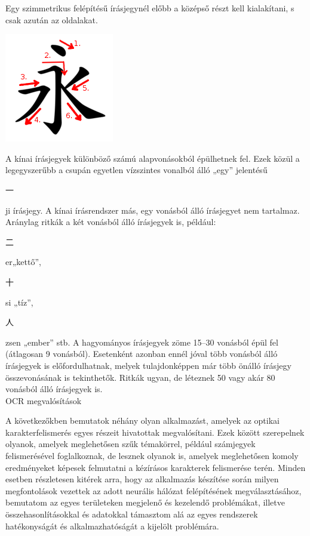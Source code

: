Egy szimmetrikus felépítésű írásjegynél előbb a középső részt kell kialakítani, s csak azután az oldalakat.

\begin{center}
	\includegraphics[scale=1.0]{images/vonasrend_ordered.png}
\end{center}

A kínai írásjegyek különböző számú alapvonásokból épülhetnek fel. Ezek közül a legegyszerűbb a csupán egyetlen vízszintes vonalból álló „egy” jelentésű \begin{CJK*}{UTF8}{gbsn}
一
\end{CJK*} ji írásjegy. A kínai írásrendszer más, egy vonásból álló írásjegyet nem tartalmaz. Aránylag ritkák a két vonásból álló írásjegyek is, például: \begin{CJK*}{UTF8}{gbsn}
二
\end{CJK*} er„kettő”,
\begin{CJK*}{UTF8}{gbsn}
十
\end{CJK*} si „tíz”,
\begin{CJK*}{UTF8}{gbsn}
人
\end{CJK*} zsen „ember” stb. A hagyományos írásjegyek zöme 15–30 vonásból épül fel (átlagosan 9 vonásból). Esetenként azonban ennél jóval több vonásból álló írásjegyek is előfordulhatnak, melyek tulajdonképpen már több önálló írásjegy összevonásának is tekinthetők. Ritkák ugyan, de léteznek 50 vagy akár 80 vonásból álló írásjegyek is.\\

{\Large OCR megvalósítások}

A következőkben bemutatok néhány olyan alkalmazást, amelyek az optikai karakterfelismerés egyes részeit hivatottak megvalósítani. Ezek között szerepelnek olyanok, amelyek meglehetősen szűk témakörrel, például számjegyek felismerésével foglalkoznak, de lesznek olyanok is, amelyek meglehetősen komoly eredményeket képesek felmutatni a kézírásos karakterek felismerése terén. Minden esetben részletesen kitérek arra, hogy az alkalmazás készítése során milyen megfontolások vezettek az adott neurális hálózat felépítésének megválasztásához, bemutatom az egyes területeken megjelenő és kezelendő problémákat, illetve összehasonlításokkal és adatokkal támasztom alá az egyes rendszerek hatékonyságát és alkalmazhatóságát a kijelölt problémára. 

